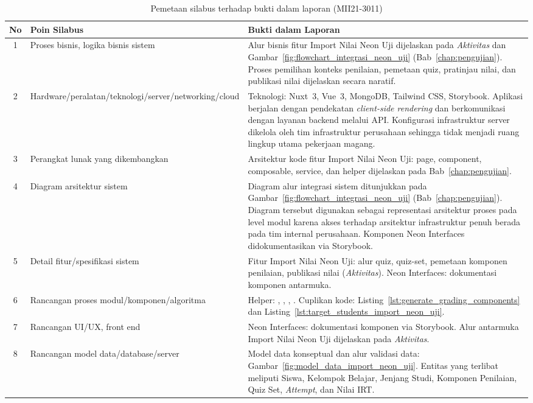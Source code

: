 \FloatBarrier
\begin{table}[!h]
	\centering
	\caption{Pemetaan silabus terhadap bukti dalam laporan (MII21-3011)}
	\label{tab:pemetaan_silabus_bab3}
	\small
	\small
	\begin{tabularx}{\textwidth}{|c|>{\raggedright\arraybackslash}p{3.8cm}|>{\raggedright\arraybackslash}X|}
		\hline
		\textbf{No} & \textbf{Poin Silabus} & \textbf{Bukti dalam Laporan} \\
		\hline
		1 & Proses bisnis, logika bisnis sistem & Alur bisnis fitur Import Nilai Neon Uji dijelaskan pada \emph{Aktivitas} dan Gambar~\ref{fig:flowchart_integrasi_neon_uji} (Bab~\ref{chap:pengujian}). Proses pemilihan konteks penilaian, pemetaan quiz, pratinjau nilai, dan publikasi nilai dijelaskan secara naratif. \\
		\hline
		2 & Hardware\slash peralatan\slash teknologi\slash server\slash networking\slash cloud & Teknologi: Nuxt~3, Vue~3, MongoDB, Tailwind CSS, Storybook. Aplikasi berjalan dengan pendekatan \textit{client-side rendering} dan berkomunikasi dengan layanan backend melalui API. Konfigurasi infrastruktur server dikelola oleh tim infrastruktur perusahaan sehingga tidak menjadi ruang lingkup utama pekerjaan magang. \\
		\hline
		3 & Perangkat lunak yang dikembangkan & Arsitektur kode fitur Import Nilai Neon Uji: page, component, composable, service, dan helper dijelaskan pada Bab~\ref{chap:pengujian}. \\
		\hline
		4 & Diagram arsitektur sistem & Diagram alur integrasi sistem ditunjukkan pada Gambar~\ref{fig:flowchart_integrasi_neon_uji} (Bab~\ref{chap:pengujian}). Diagram tersebut digunakan sebagai representasi arsitektur proses pada level modul karena akses terhadap arsitektur infrastruktur penuh berada pada tim internal perusahaan. Komponen Neon Interfaces didokumentasikan via Storybook. \\
		\hline
		5 & Detail fitur\slash spesifikasi sistem & Fitur Import Nilai Neon Uji: alur quiz, quiz-set, pemetaan komponen penilaian, publikasi nilai (\emph{Aktivitas}). Neon Interfaces: dokumentasi komponen antarmuka. \\
		\hline
		6 & Rancangan proses modul/komponen/algoritma & Helper: \code{canProceedImportNeonUji}, \code{resetImportNeonUjiFiltersFromField}, \code{normalizeImportNeonUjiTargetIds}, \code{selectImportNeonUjiScore}. Cuplikan kode: Listing~\ref{lst:generate_grading_components} dan Listing~\ref{lst:target_students_import_neon_uji}. \\
		\hline
		7 & Rancangan UI\slash UX, front end & Neon Interfaces: dokumentasi komponen via Storybook. Alur antarmuka Import Nilai Neon Uji dijelaskan pada \emph{Aktivitas}. \\
		\hline
		8 & Rancangan model data\slash database\slash server & Model data konseptual dan alur validasi data: Gambar~\ref{fig:model_data_import_neon_uji}. Entitas yang terlibat meliputi Siswa, Kelompok Belajar, Jenjang Studi, Komponen Penilaian, Quiz Set, \textit{Attempt}, dan Nilai IRT. \\
		\hline
	\end{tabularx}
\end{table}
\FloatBarrier

